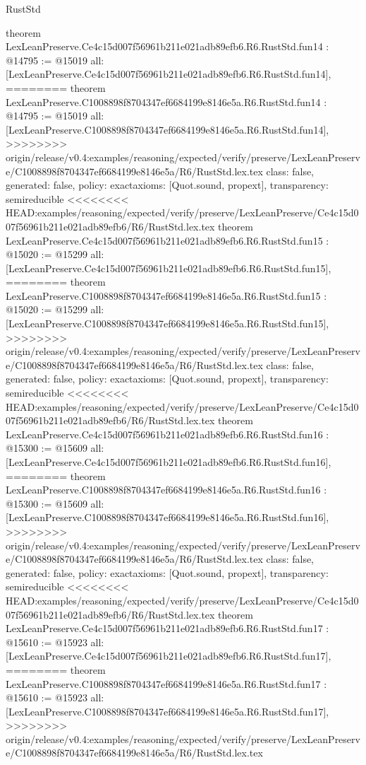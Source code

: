 \begin{lexlean}{RustStd}
\begin{coremodule}
{\begin{coremodule}
{{{{{{{{{{{{{{{{theorem LexLeanPreserve.Ce4c15d007f56961b211e021adb89efb6.R6.RustStd.fun14 : @14795 := @15019 {
  all: [LexLeanPreserve.Ce4c15d007f56961b211e021adb89efb6.R6.RustStd.fun14],
========
theorem LexLeanPreserve.C1008898f8704347ef6684199e8146e5a.R6.RustStd.fun14 : @14795 := @15019 {
  all: [LexLeanPreserve.C1008898f8704347ef6684199e8146e5a.R6.RustStd.fun14],
>>>>>>>> origin/release/v0.4:examples/reasoning/expected/verify/preserve/LexLeanPreserve/C1008898f8704347ef6684199e8146e5a/R6/RustStd.lex.tex
  class: false,
  generated: false,
  policy: exact{axioms: [Quot.sound, propext]},
  transparency: semireducible
}
<<<<<<<< HEAD:examples/reasoning/expected/verify/preserve/LexLeanPreserve/Ce4c15d007f56961b211e021adb89efb6/R6/RustStd.lex.tex
theorem LexLeanPreserve.Ce4c15d007f56961b211e021adb89efb6.R6.RustStd.fun15 : @15020 := @15299 {
  all: [LexLeanPreserve.Ce4c15d007f56961b211e021adb89efb6.R6.RustStd.fun15],
========
theorem LexLeanPreserve.C1008898f8704347ef6684199e8146e5a.R6.RustStd.fun15 : @15020 := @15299 {
  all: [LexLeanPreserve.C1008898f8704347ef6684199e8146e5a.R6.RustStd.fun15],
>>>>>>>> origin/release/v0.4:examples/reasoning/expected/verify/preserve/LexLeanPreserve/C1008898f8704347ef6684199e8146e5a/R6/RustStd.lex.tex
  class: false,
  generated: false,
  policy: exact{axioms: [Quot.sound, propext]},
  transparency: semireducible
}
<<<<<<<< HEAD:examples/reasoning/expected/verify/preserve/LexLeanPreserve/Ce4c15d007f56961b211e021adb89efb6/R6/RustStd.lex.tex
theorem LexLeanPreserve.Ce4c15d007f56961b211e021adb89efb6.R6.RustStd.fun16 : @15300 := @15609 {
  all: [LexLeanPreserve.Ce4c15d007f56961b211e021adb89efb6.R6.RustStd.fun16],
========
theorem LexLeanPreserve.C1008898f8704347ef6684199e8146e5a.R6.RustStd.fun16 : @15300 := @15609 {
  all: [LexLeanPreserve.C1008898f8704347ef6684199e8146e5a.R6.RustStd.fun16],
>>>>>>>> origin/release/v0.4:examples/reasoning/expected/verify/preserve/LexLeanPreserve/C1008898f8704347ef6684199e8146e5a/R6/RustStd.lex.tex
  class: false,
  generated: false,
  policy: exact{axioms: [Quot.sound, propext]},
  transparency: semireducible
}
<<<<<<<< HEAD:examples/reasoning/expected/verify/preserve/LexLeanPreserve/Ce4c15d007f56961b211e021adb89efb6/R6/RustStd.lex.tex
theorem LexLeanPreserve.Ce4c15d007f56961b211e021adb89efb6.R6.RustStd.fun17 : @15610 := @15923 {
  all: [LexLeanPreserve.Ce4c15d007f56961b211e021adb89efb6.R6.RustStd.fun17],
========
theorem LexLeanPreserve.C1008898f8704347ef6684199e8146e5a.R6.RustStd.fun17 : @15610 := @15923 {
  all: [LexLeanPreserve.C1008898f8704347ef6684199e8146e5a.R6.RustStd.fun17],
>>>>>>>> origin/release/v0.4:examples/reasoning/expected/verify/preserve/LexLeanPreserve/C1008898f8704347ef6684199e8146e5a/R6/RustStd.lex.tex
}}}}}}}}}}}}}}}}}}}}}
\end{coremodule}}
\end{coremodule}
\end{lexlean}
